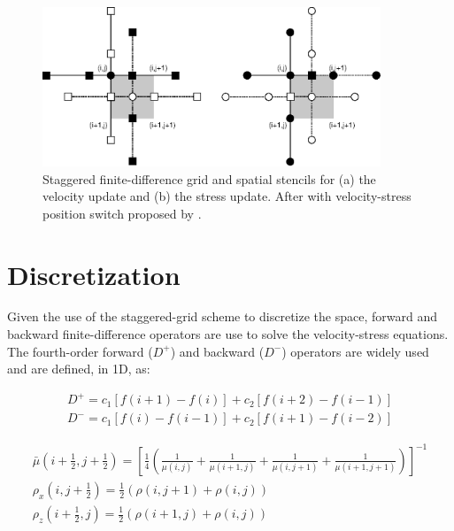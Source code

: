 \documentclass{gnulike}
\begin{document}
\begin{figure}[!ht]
  \centering
  \includegraphics[width=0.9\textwidth]{fig/staggered.eps}
  \caption{Staggered finite-difference grid and spatial stencils for (a) the velocity update and (b) the stress update. After \cite{levander1988fourth} with velocity-stress position switch proposed by \cite{bohlen2006accuracy}.}
  \label{fig:staggered-grid}
\end{figure}

\section{Discretization}

\noindent Given the use of the staggered-grid scheme to discretize the space, forward and backward finite-difference operators are use to solve the velocity-stress equations.\\


\noindent The fourth-order forward ($D^{+}$) and backward ($D^{-}$) operators are widely used and are defined, in 1D, as:

\begin{eqnarray}
  D^{+}=c_{1}[f(i+1)-f(i)]+c_{2}[f(i+2)-f(i-1)] \nonumber \\
  D^{-}=c_{1}[f(i)-f(i-1)]+c_{2}[f(i+1)-f(i-2)]
\end{eqnarray}

\citet{graves1996simulating}
\begin{eqnarray}
  \bar{\mu}(i+\frac{1}{2}, j+\frac{1}{2})=\left[ \frac{1}{4} \left( \frac{1}{\mu(i,j)}+\frac{1}{\mu(i+1,j)}+\frac{1}{\mu(i,j+1)}+\frac{1}{\mu(i+1,j+1)} \right) \right]^{-1} \\
  \rho_{x}(i,j+\frac{1}{2}) = \frac{1}{2}(\rho (i,j+1)+\rho(i,j)) \\
  \rho_{z}(i+\frac{1}{2},j) = \frac{1}{2}(\rho (i+1,j)+\rho(i,j))
\end{eqnarray}
\end{document}

